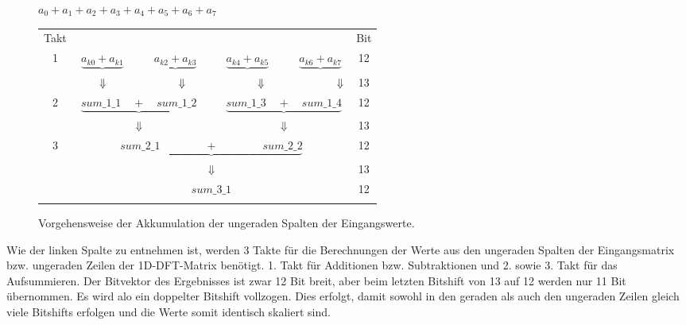 \begin{figure}[htbp]
\centering
$a_{0} + a_{1} + a_{2} + a_{3} + a_{4} + a_{5} + a_{6} + a_{7}$\\

\vspace{0.5cm}
\begin{tabular}{ccccccccc}
Takt&\multicolumn{6}{l}{ } & & Bit\\
1&$\underbrace{a_{k0} + a_{k1}}$ &  &$ \underbrace{a_{k2} + a_{k3}}$ &  &$\underbrace{a_{k4} + a_{k5}}$ &  &$\underbrace{a_{k6} + a_{k7}}$ & 12\\
&\multicolumn{7}{l}{$\hspace{0.65cm} \Downarrow \hspace{2.3cm} \Downarrow \hspace{2.3cm} \Downarrow \hspace{2.3cm}\Downarrow$}&13\\
2&\multicolumn{3}{c}{$\underbrace{sum\_1\_1 \quad + \quad sum\_1\_2}$} & & \multicolumn{3}{c}{$\underbrace{sum\_1\_3 \quad + \quad sum\_1\_4}$} & 12\\
&\multicolumn{3}{c}{$\Downarrow$} & & \multicolumn{3}{c}{$\Downarrow$}&13\\
3&\multicolumn{7}{c}{$\underbrace{sum\_2\_1 \quad  \quad \quad \quad + \quad \quad \quad  \quad sum\_2\_2}$} & 12\\
&\multicolumn{7}{c}{$\Downarrow$}&13\\
&\multicolumn{7}{c}{$sum\_3\_1$} & 12\\
&\end{tabular}
\caption{Vorgehensweise der Akkumulation der ungeraden Spalten der Eingangswerte.}
\label{pic:AkkumulationUngeradeSpalten}
\end{figure}

\vspace{0.5cm}

Wie der linken Spalte zu entnehmen ist, werden 3 Takte für die Berechnungen der Werte aus den ungeraden Spalten der Eingangsmatrix bzw. ungeraden Zeilen der 1D-DFT-Matrix benötigt.
1. Takt für Additionen bzw. Subtraktionen und 2. sowie 3. Takt für das Aufsummieren. Der Bitvektor des Ergebnisses ist zwar 12 Bit breit, aber beim letzten Bitshift von 13 auf 12
werden nur 11 Bit übernommen. Es wird alo ein doppelter Bitshift vollzogen. Dies erfolgt, damit sowohl in den geraden als auch den ungeraden Zeilen gleich viele Bitshifts erfolgen
und die Werte somit identisch skaliert sind.

